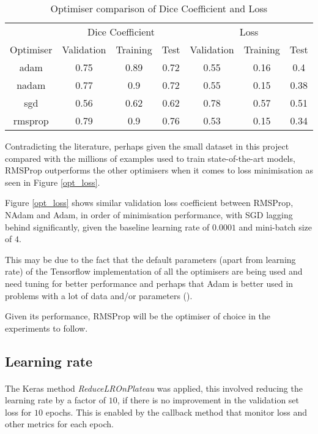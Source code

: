 \begin{table}[ht!] 
    \begin{center}
    \begin{tabular}{ccccccc} 
    \toprule
       & \multicolumn{3}{c}{Dice Coefficient}     & \multicolumn{3}{c}{Loss} \\
    Optimiser & Validation & Training & Test & Validation    & Training    & Test   \\ \midrule

    adam & 0.75 & 0.89 & 0.72 & 0.55 & 0.16 & 0.4  \\ nadam & 0.77 & 0.9 & 0.72 & 0.55 & 0.15 & 0.38  \\ sgd & 0.56 & 0.62 & 0.62 & 0.78 & 0.57 & 0.51  \\ \rowcolor{lightgray} rmsprop & 0.79 & 0.9 & 0.76 & 0.53 & 0.15 & 0.34  \\ 
    
    \bottomrule
    \end{tabular}
  \end{center} 
  \caption{Optimiser comparison of Dice Coefficient and Loss}\label{tab_opt}
\end{table}

Contradicting the literature, perhaps given the small dataset in this project compared with the millions of examples used to train state-of-the-art models, \gls{RMSProp} outperforms the other optimisers when it comes to loss minimisation as seen in Figure \ref{opt_loss}.

Figure \ref{opt_loss} shows similar validation loss coefficient between \gls{RMSProp}, \gls{NAdam} and \gls{Adam}, in order of minimisation performance, with \gls{SGD} lagging behind significantly, given the baseline learning rate of $0.0001$ and mini-batch size of $4$.

This may be due to the fact that the default parameters (apart from learning rate) of the Tensorflow implementation of all the optimisers are being used and need tuning for better performance and perhaps that \gls{Adam} is better used in problems with a lot of data and/or parameters (\cite{kingma2017adam}). 

Given its performance, \gls{RMSProp} will be the optimiser of choice in the experiments to follow.
\subsection{Learning rate}
\paragraph{}
The Keras method \textit{ReduceLROnPlateau} was applied, this involved reducing the learning rate by a factor of $10$, if there is no improvement in the validation set loss for $10$ epochs. This is enabled by the callback method that monitor loss and other metrics for each epoch.

